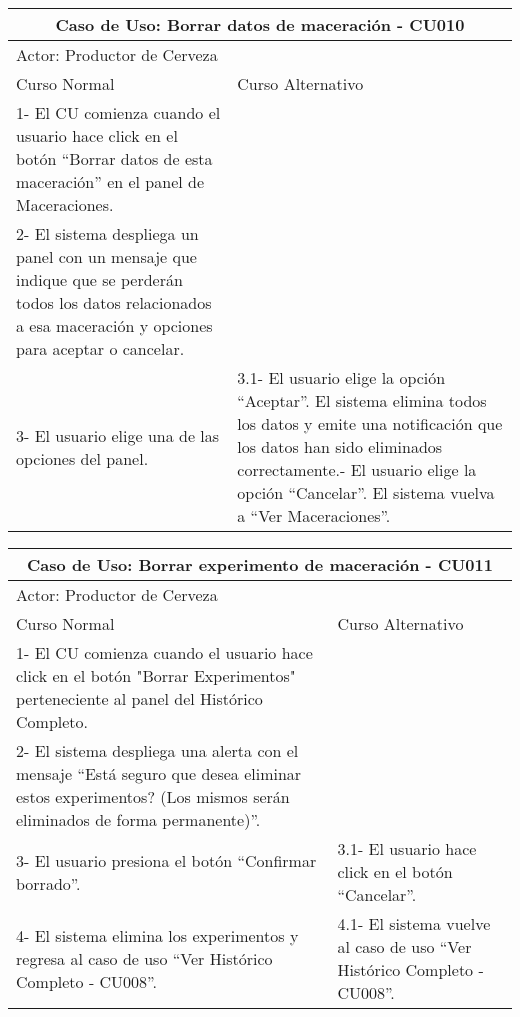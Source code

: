    
    \begin{minipage}{0.95\textwidth}
    \begin{center}
    \begin{tabularx}{\textwidth}{ | X | X |}
        \hline
        \multicolumn{2}{|c|}{\textbf{Caso de Uso: Borrar datos de maceración - CU010}} \\
        \hline
        \multicolumn{2}{|l|}{Actor: Productor de Cerveza} \\
        \hline
        Curso Normal & Curso Alternativo \\
        \hline
        1- El CU comienza cuando el usuario hace click en el botón “Borrar datos de esta maceración” en el panel de Maceraciones. & \\
        \hline
        2- El sistema despliega un panel con un mensaje que indique que se perderán todos los datos relacionados a esa maceración y opciones para aceptar o cancelar. &
        \\
        \hline
        3- El usuario elige una de las opciones del panel. & 3.1- El usuario elige la opción “Aceptar”. El sistema elimina todos los datos y emite una notificación que los datos han sido eliminados correctamente.\newline
        3.2- El usuario elige la opción “Cancelar”. El sistema vuelva a “Ver Maceraciones”.
        \\
        \hline
    \end{tabularx}
    \label{CU010}
    \end{center}
    \end{minipage}
    
    
    \begin{minipage}{0.95\textwidth}
    \begin{center}
    \begin{tabularx}{\textwidth}{ | X | X |}
        \hline
        \multicolumn{2}{|c|}{\textbf{Caso de Uso: Borrar experimento de maceración - CU011}} \\
        \hline
        \multicolumn{2}{|l|}{Actor: Productor de Cerveza} \\
        \hline
        Curso Normal & Curso Alternativo \\
        \hline
        1- El CU comienza cuando el usuario hace click en el botón "Borrar Experimentos" perteneciente al panel del Histórico Completo. & \\
        \hline
        2- El sistema despliega una alerta con el mensaje “Está seguro que desea eliminar estos experimentos? (Los mismos serán eliminados de forma permanente)”. &
        \\
        \hline
        3- El usuario presiona el botón “Confirmar borrado”. & 3.1- El usuario hace click en el botón “Cancelar”.
        \\
        \hline
        4- El sistema elimina los experimentos y regresa al caso de uso “Ver Histórico Completo - CU008”. & 4.1- El sistema vuelve al caso de uso “Ver Histórico Completo - CU008”.
        \\
        \hline
    \end{tabularx}
    \label{CU011}
    \end{center}
    \end{minipage}
    
